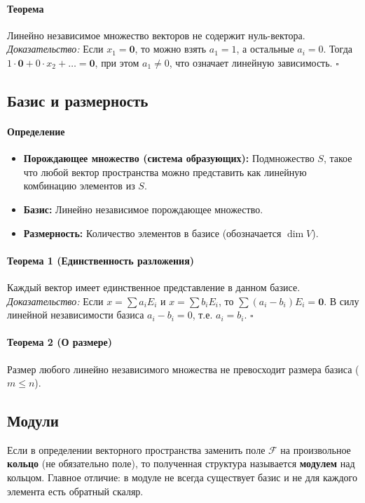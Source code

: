 \paragraph{Теорема}
Линейно независимое множество векторов не содержит нуль-вектора.
\textit{Доказательство:} Если $x_1 = \mathbf{0}$, то можно взять $a_1 = 1$, а остальные $a_i = 0$. Тогда $1 \cdot \mathbf{0} + 0 \cdot x_2 + \dots = \mathbf{0}$, при этом $a_1 \neq 0$, что означает линейную зависимость. $\square$

\subsection*{Базис и размерность}

\paragraph{Определение}
\begin{itemize}
    \item \textbf{Порождающее множество (система образующих):} Подмножество $S$, такое что любой вектор пространства можно представить как линейную комбинацию элементов из $S$.
    \item \textbf{Базис:} Линейно независимое порождающее множество.
    \item \textbf{Размерность:} Количество элементов в базисе (обозначается $\dim V$).
\end{itemize}

\paragraph{Теорема 1 (Единственность разложения)}
Каждый вектор имеет единственное представление в данном базисе.
\textit{Доказательство:} Если $x = \sum a_i E_i$ и $x = \sum b_i E_i$, то $\sum (a_i - b_i) E_i = \mathbf{0}$. В силу линейной независимости базиса $a_i - b_i = 0$, т.е. $a_i = b_i$. $\square$

\paragraph{Теорема 2 (О размере)}
Размер любого линейно независимого множества не превосходит размера базиса ($m \le n$).

\subsection*{Модули}
Если в определении векторного пространства заменить поле $\mathcal{F}$ на произвольное \textbf{кольцо} (не обязательно поле), то полученная структура называется \textbf{модулем} над кольцом. Главное отличие: в модуле не всегда существует базис и не для каждого элемента есть обратный скаляр.

